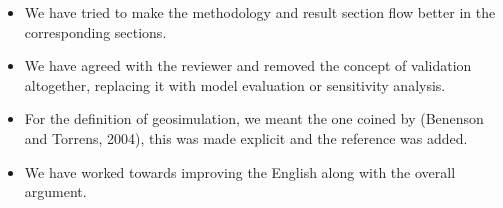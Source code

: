 \documentclass[11pt,a4paper,sans]{moderncv}        %
\begin{document}
\begin{itemize}
	\item We have tried to make the methodology and result section flow better in the corresponding sections.
	
	\item We have agreed with the reviewer and removed the concept of validation altogether, replacing it with model evaluation or sensitivity analysis.
	
	\item For the definition of geosimulation, we meant the one coined by (Benenson and Torrens, 2004), this was made explicit and the reference was added. 
    	
	\item We have worked towards improving the English along with the overall argument. 
	

\end{itemize}
\end{document}
